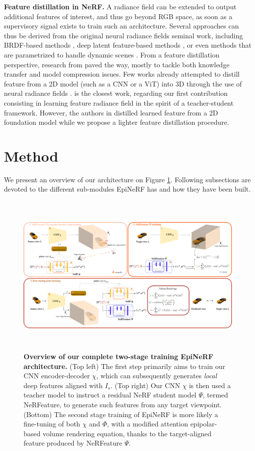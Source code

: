 \noindent\textbf{Feature distillation in NeRF.} A radiance field can be extended to output additional features of interest, and thus go beyond RGB space, as soon as a supervisory signal exists to train such an architecture. Several approaches can thus be derived from the original neural radiance fields seminal work, including BRDF-based methods \citep{boss2021nerd,verbin2022ref}, deep latent feature-based methods \citep{kobayashi2022decomposing,ye2023featurenerf,chan2023genvs}, or even methods that are parametrized to handle dynamic scenes \citep{pumarola2021d,yan2023nerf}. From a feature distillation perspective, research from \citep{hinton2015distilling} paved the way, mostly to tackle both knowledge transfer and model compression issues. Few works already attempted to distill feature from a 2D model (such as a CNN or a ViT) into 3D through the use of neural radiance fields \citep{kobayashi2022decomposing, tschernezki2022neural}. \citep{ye2023featurenerf} is the closest work, regarding our first contribution consisting in learning feature radiance field in the spirit of a teacher-student framework. However, the authors in \citep{ye2023featurenerf} distilled learned feature from a 2D foundation model \citep{oquab2023dinov2} while we propose a lighter feature distillation procedure. 

\section{Method}
\label{sec:epinerf/method}
We present an overview of our architecture on Figure \ref{fig:overview}. Following subsections are devoted to the different sub-modules EpiNeRF has and how they have been built.
\begin{figure}[htb!]
    \center
  \includegraphics[height=8cm]{images/epinerf/overview_architecture.png}
  \caption{\textbf{Overview of our complete two-stage training EpiNeRF architecture.} (Top left) The first step primarily aims to train our CNN encoder-decoder $\chi$, which can subsequently generates \textit{local} deep features aligned with $I_{s}$. (Top right) Our CNN $\chi$ is then used a teacher model to instruct a residual NeRF student model $\Psi$, termed NeRFeature, to generate such features from any target viewpoint. (Bottom) The second stage training of EpiNeRF is more likely a fine-tuning of both $\chi$ and $\Phi$, with a modified attention epipolar-based volume rendering equation, thanks to the target-aligned feature produced by NeRFeature $\Psi$.}
  \label{fig:overview}
\end{figure}
